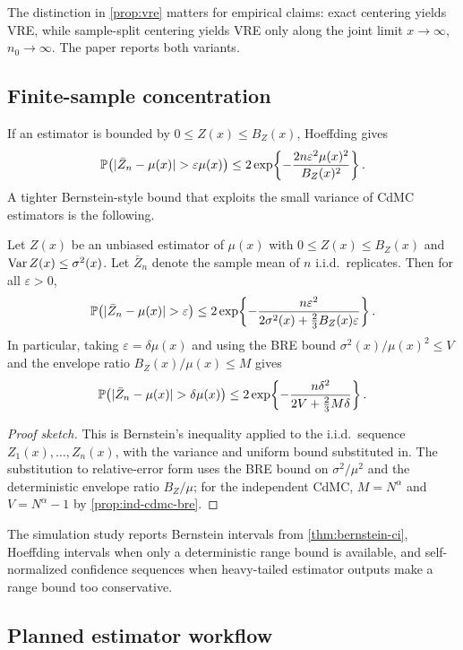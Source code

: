 The distinction in \cref{prop:vre} matters for empirical claims: exact
centering yields VRE, while sample-split centering yields VRE only along
the joint limit $x\to\infty$, $n_0\to\infty$. The paper reports both variants.

\subsection{Finite-sample concentration}

If an estimator is bounded by \(0\le Z(x)\le B_Z(x)\), Hoeffding gives
\[
  \Pb\!\left(|\bar Z_n-\mu(x)|>\varepsilon\mu(x)\right)
  \le 2\exp\!\left\{-\frac{2n\varepsilon^2\mu(x)^2}{B_Z(x)^2}\right\}.
\]
A tighter Bernstein-style bound that exploits the small variance of CdMC
estimators is the following.

\begin{theorem}
\label{thm:bernstein-ci}
Let $Z(x)$ be an unbiased estimator of $\mu(x)$ with $0\le Z(x)\le B_Z(x)$ and
$\operatorname{Var} Z(x)\le \sigma^2(x)$. Let $\bar Z_n$ denote the sample mean of $n$ i.i.d.\
replicates. Then for all $\varepsilon>0$,
\[
  \Pb\!\left(|\bar Z_n-\mu(x)|>\varepsilon\right)
  \le 2\exp\!\left\{-\frac{n\varepsilon^2}{2\sigma^2(x)+\tfrac{2}{3}B_Z(x)\varepsilon}\right\}.
\]
In particular, taking $\varepsilon=\delta\mu(x)$ and using the BRE bound
$\sigma^2(x)/\mu(x)^2\le V$ and the envelope ratio
$B_Z(x)/\mu(x)\le M$ gives
\[
  \Pb\!\left(|\bar Z_n-\mu(x)|>\delta\mu(x)\right)
  \le 2\exp\!\left\{-\frac{n\delta^2}{2V+\tfrac{2}{3}M\delta}\right\}.
\]
\end{theorem}

\begin{proof}[Proof sketch]
This is Bernstein's inequality applied to the i.i.d.\ sequence
$Z_1(x),\ldots,Z_n(x)$, with the variance and uniform bound substituted in.
The substitution to relative-error form uses the BRE bound on $\sigma^2/\mu^2$
and the deterministic envelope ratio $B_Z/\mu$; for the independent CdMC,
$M=N^\alpha$ and $V=N^\alpha-1$ by \cref{prop:ind-cdmc-bre}.
\end{proof}

The simulation study reports Bernstein intervals from \cref{thm:bernstein-ci},
Hoeffding intervals when only a deterministic range bound is available, and
self-normalized confidence sequences when heavy-tailed estimator outputs make
a range bound too conservative.

\subsection{Planned estimator workflow}


